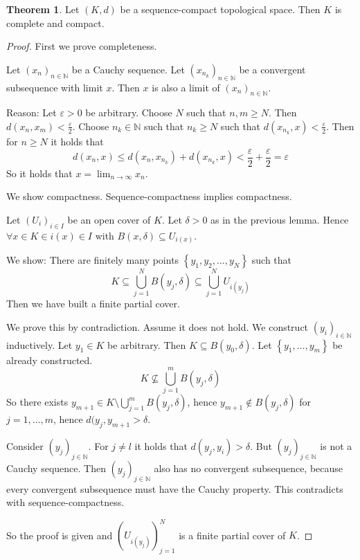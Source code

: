 \documentclass[a4paper,landscape,twocolumn]{article}
\theoremstyle{definition}
\newtheorem{theorem}{Theorem}
\newcommand\set[1]{\left\{#1\right\}}
\begin{document}
\begin{theorem}
  Let $(K,d)$ be a sequence-compact topological space.
  Then $K$ is complete and compact.
\end{theorem}
\begin{proof}
  First we prove completeness.

  Let $(x_n)_{n \in \mathbb N}$ be a Cauchy sequence.
  Let $(x_{n_k})_{n \in \mathbb N}$ be a convergent subsequence with limit $x$.
  Then $x$ is also a limit of $(x_n)_{n \in \mathbb N}$.

  Reason: Let $\varepsilon > 0$ be arbitrary. Choose $N$ such that $n,m \geq N$.
  Then $d(x_n, x_m) < \frac{\varepsilon}{2}$. Choose $n_k \in \mathbb N$ such that
  $n_k \geq N$ such that $d(x_{n_k}, x) < \frac{\varepsilon}{2}$. Then for $n \geq N$
  it holds that
  \[ d(x_n, x) \leq d(x_n, x_{n_k}) + d(x_{n_k}, x) < \frac\varepsilon2 + \frac\varepsilon2 = \varepsilon \]
  So it holds that $x = \lim_{n\to\infty} x_n$.

  We show compactness.
  Sequence-compactness implies compactness.

  Let $(U_i)_{i \in I}$ be an open cover of $K$. Let $\delta > 0$
  as in the previous lemma. Hence $\forall x \in K \in i(x) \in I$ with
  $B(x, \delta) \subseteq U_{i(x)}$.

  We show:
  There are finitely many points $\set{y_1, y_2, \ldots, y_N}$ such that
  \[ K \subseteq \bigcup_{j=1}^N B(y_j, \delta) \subseteq \bigcup_{j=1}^N U_{i(y_j)} \]
  Then we have built a finite partial cover.

  We prove this by contradiction.
  Assume it does not hold. We construct $(y_i)_{i \in \mathbb N}$ inductively.
  Let $y_1 \in K$ be arbitrary. Then $K \subseteq B(y_0, \delta)$.
  Let $\set{y_1, \ldots, y_m}$ be already constructed.
  \[ K \not\subseteq \bigcup_{j=1}^m B(y_j, \delta) \]
  So there exists $y_{m+1} \in K \setminus \bigcup_{j=1}^m B(y_j, \delta)$,
  hence $y_{m+1} \not\in B(y_j, \delta)$ for $j = 1, \ldots, m$, hence
  $d(y_j, y_{m+1} > \delta$.

  Consider $(y_j)_{j \in \mathbb N}$. For $j \neq l$ it holds that
  $d(y_j, y_i) > \delta$. But $(y_j)_{j \in \mathbb N}$ is not a Cauchy
  sequence. Then $(y_j)_{j \in \mathbb N}$ also has no convergent subsequence,
  because every convergent subsequence must have the Cauchy property.
  This contradicts with sequence-compactness.

  So the proof is given and $\left(U_{i(y_j)}\right)_{j=1}^N$ is a finite partial cover of $K$.
\end{proof}
\end{document}
